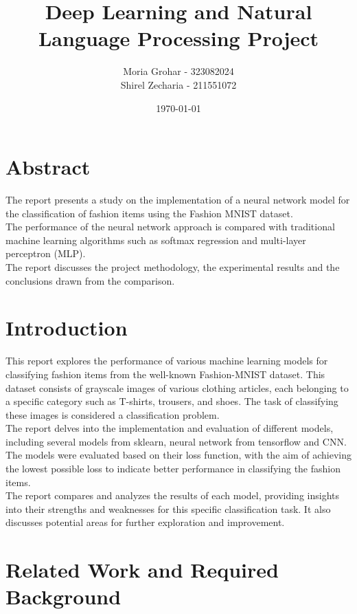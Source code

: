 \documentclass{article}
\title{Deep Learning and Natural Language Processing Project}
\author{Moria Grohar - 323082024\\
Shirel Zecharia - 211551072}
\date{\today}
\begin{document}
\maketitle
\tableofcontents
\newpage

\section{Abstract}
The report presents a study on the implementation of a neural network model for the classification of fashion items using the Fashion MNIST dataset.\\
The performance of the neural network approach is compared with traditional machine learning algorithms such as softmax regression and multi-layer perceptron (MLP).\\
The report discusses the project methodology, the experimental results and the conclusions drawn from the comparison.

\section{Introduction}
This report explores the performance of various machine learning models for classifying fashion items from the well-known Fashion-MNIST dataset. This dataset consists of grayscale images of various clothing articles, each belonging to a specific category such as T-shirts, trousers, and shoes. The task of classifying these images is considered a classification problem.\\
The report delves into the implementation and evaluation of different models,
including several models from sklearn, neural network from tensorflow and CNN.\\
The models were evaluated based on their loss function, with the aim of achieving the lowest possible loss to indicate better performance in classifying the fashion items.\\
The report compares and analyzes the results of each model, providing insights into their strengths and weaknesses for this specific classification task. It also discusses potential areas for further exploration and improvement.

\section{Related Work and Required Background}
\end{document}
